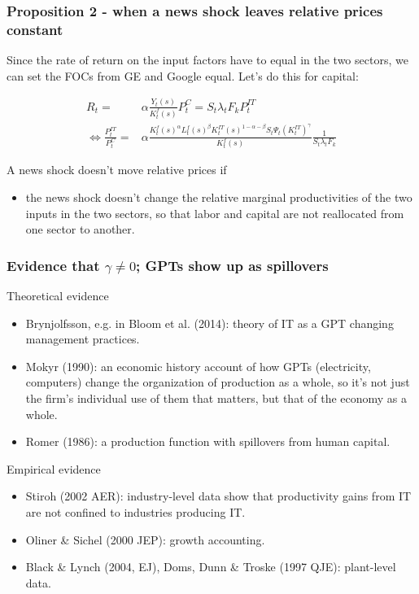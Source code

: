 \documentclass{beamer}
\begin{document}
\begin{frame}
\frametitle{Proposition 2 - when a news shock leaves relative prices constant}

Since the rate of return on the input factors have to equal in the two sectors, we can set the FOCs from GE and Google equal. Let's do this for capital:

\begin{align*}
R_t = & \alpha \frac{Y_t(s)}{K^f_t(s)} P^C_t = S_t \lambda_t F_k P^{IT}_t \\
\Leftrightarrow \frac{P^{IT}_t }{P^{C}_t } = & \alpha \frac{K^f_t(s)^{\alpha}L^f_t(s)^{\beta}K^{IT}_t(s)^{1-\alpha - \beta}S_t \Psi_t (K^{IT}_t)^{\gamma} }{K^f_t(s)} \frac{1}{S_t \lambda_t F_k}
\end{align*}


A news shock doesn't move relative prices if 
\begin{itemize}
\item the news shock doesn't change the relative marginal productivities of the two inputs in the two sectors, so that labor and capital are not reallocated from one sector to another.
\end{itemize}

\end{frame}

\begin{frame}
\frametitle{Evidence that $\gamma \neq 0$; GPTs show up as spillovers}

Theoretical evidence
\begin{itemize}
\item Brynjolfsson, e.g. in Bloom et al. (2014): theory of IT as a GPT changing management practices.
\item Mokyr (1990):  an economic history account of how GPTs (electricity, computers) change the organization of production as a whole, so it's not just the firm's individual use of them that matters, but that of the economy as a whole.
\item Romer (1986): a production function with spillovers from human capital.
\end{itemize}

Empirical evidence
\begin{itemize}
\item Stiroh (2002 AER): industry-level data show that productivity gains from IT are not confined to industries producing IT.
\item Oliner \& Sichel (2000 JEP): growth accounting.
\item Black \& Lynch (2004, EJ), Doms, Dunn \& Troske (1997 QJE): plant-level data.
\end{itemize}

\end{frame}
\end{document}
